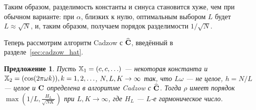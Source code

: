\documentclass[12pt,a4paper,fleqn,leqno]{article}
\newtheorem{proposition}{Предложение}%
\begin{document}
Таким образом, разделимость константы и синуса становится хуже, чем при обычном варианте: при $\alpha$, близких к нулю, оптимальным выбором $L$ будет $L \approx \sqrt{N}$, и, таким образом, получаем порядок разделимости $1/\sqrt{N}$.

Теперь рассмотрим алгоритм Cadzow с $\widehat{\mathbf{C}}$, введённый в разделе~\ref{sec:cadzow_hat}.

\begin{proposition}
Пусть $\mathbb{X}_1 = (c, c, \ldots)$ --- некоторая константа и $\mathbb{X}_2 = (\cos(2 \pi \omega k)), k = 1, 2, \ldots$, $N,L,K\rightarrow \infty$ так, что $L\omega$ --- не целое, $h = N/L$ --- целое и $\mathbf{C}$ определена в алгоритме Cadzow с $\widehat{\mathbf{C}}$.
 Тогда $\rho$ имеет порядок $\max \left(1/L, \frac{H_L}{\sqrt{NK}} \right)$ при $L, K \to \infty$, где $H_L$ --- $L$-е гармоническое число.
\end{proposition}
\end{document}
